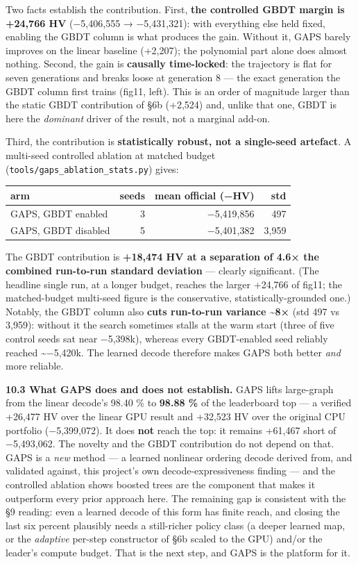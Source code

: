\documentclass[
  11pt,
]{article}
\begin{document}
Two facts establish the contribution. First, \textbf{the controlled GBDT
margin is +24,766 HV} (−5,406,555 → −5,431,321): with everything else
held fixed, enabling the GBDT column is what produces the gain. Without
it, GAPS barely improves on the linear baseline (+2,207); the polynomial
part alone does almost nothing. Second, the gain is \textbf{causally
time-locked}: the trajectory is flat for seven generations and breaks
loose at generation 8 --- the exact generation the GBDT column first
trains (fig11, left). This is an order of magnitude larger than the
static GBDT contribution of §6b (+2,524) and, unlike that one, GBDT is
here the \emph{dominant} driver of the result, not a marginal add-on.

Third, the contribution is \textbf{statistically robust, not a
single-seed artefact}. A multi-seed controlled ablation at matched
budget (\texttt{tools/gaps\_ablation\_stats.py}) gives:

\begin{longtable}[]{@{}lrrr@{}}
\toprule
arm & seeds & mean official (−HV) & std\tabularnewline
\midrule
\endhead
GAPS, GBDT enabled & 3 & −5,419,856 & 497\tabularnewline
GAPS, GBDT disabled & 5 & −5,401,382 & 3,959\tabularnewline
\bottomrule
\end{longtable}

The GBDT contribution is \textbf{+18,474 HV at a separation of 4.6× the
combined run-to-run standard deviation} --- clearly significant. (The
headline single run, at a longer budget, reaches the larger +24,766 of
fig11; the matched-budget multi-seed figure is the conservative,
statistically-grounded one.) Notably, the GBDT column also \textbf{cuts
run-to-run variance \textasciitilde8×} (std 497 vs 3,959): without it
the search sometimes stalls at the warm start (three of five control
seeds sat near −5,398k), whereas every GBDT-enabled seed reliably
reached \textasciitilde−5,420k. The learned decode therefore makes GAPS
both better \emph{and} more reliable.

\textbf{10.3 What GAPS does and does not establish.} GAPS lifts
large-graph from the linear decode's 98.40 \% to \textbf{98.88 \%} of
the leaderboard top --- a verified +26,477 HV over the linear GPU result
and +32,523 HV over the original CPU portfolio (−5,399,072). It does
\textbf{not} reach the top: it remains +61,467 short of −5,493,062. The
novelty and the GBDT contribution do not depend on that. GAPS is a
\emph{new} method --- a learned nonlinear ordering decode derived from,
and validated against, this project's own decode-expressiveness finding
--- and the controlled ablation shows boosted trees are the component
that makes it outperform every prior approach here. The remaining gap is
consistent with the §9 reading: even a learned decode of this form has
finite reach, and closing the last six percent plausibly needs a
still-richer policy class (a deeper learned map, or the \emph{adaptive}
per-step constructor of §6b scaled to the GPU) and/or the leader's
compute budget. That is the next step, and GAPS is the platform for it.
\end{document}
